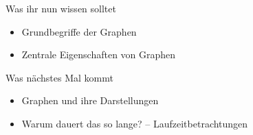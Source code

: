 \begin{frame}	
	\begin{block}{Was ihr nun wissen solltet}
		\begin{itemize}
			\item Grundbegriffe der Graphen
			\item Zentrale Eigenschaften von Graphen
		\end{itemize}
	\end{block}
	
	\begin{block}{Was nächstes Mal kommt}
		\begin{itemize}
			\item Graphen und ihre Darstellungen
			\item Warum dauert das so lange? -- Laufzeitbetrachtungen
		\end{itemize}
	\end{block}
\end{frame}


\slideThanks

